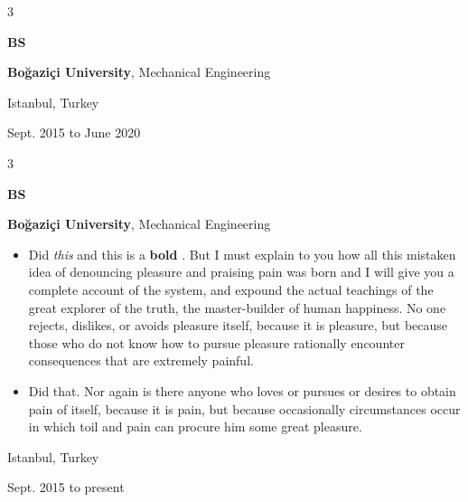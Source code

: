 \documentclass[10pt, letterpaper]{article}
\newenvironment{highlights}{
    \begin{itemize}[
        topsep=0.10 cm,
        parsep=0.10 cm,
        partopsep=0pt,
        itemsep=0pt,
        leftmargin=0.4 cm + 10pt
    ]
}{
    \end{itemize}
} %
\newenvironment{threecolentry}[3][]{
    \onecolentry
    \def\thirdColumn{#3}
    \setcolumnwidth{1 cm, \fill, 4.5 cm}
    \begin{paracol}{3}
    {\raggedright #2} \switchcolumn
}{
    \switchcolumn \raggedleft \thirdColumn
    \end{paracol}
    \endonecolentry
} %
\let\hrefWithoutArrow\href
\renewcommand{\href}[2]{\hrefWithoutArrow{#1}{\mbox{\ifthenelse{\equal{#2}{}}{ }{#2 }\raisebox{.15ex}{\footnotesize \faExternalLink*}}}}
\begin{document}
        \vspace{0.2 cm}

        \begin{threecolentry}{\textbf{BS}}{
            Istanbul, Turkey

        Sept. 2015 to June 2020
        }
            \textbf{Boğaziçi University}, Mechanical Engineering
        \end{threecolentry}

        \vspace{0.2 cm}

        \begin{threecolentry}{\textbf{BS}}{
            Istanbul, Turkey

        Sept. 2015 to present
        }
            \textbf{Boğaziçi University}, Mechanical Engineering
            \begin{highlights}
                \item Did \textit{this} and this is a \textbf{bold} \href{https://example.com}{link}. But I must explain to you how all this mistaken idea of denouncing pleasure and praising pain was born and I will give you a complete account of the system, and expound the actual teachings of the great explorer of the truth, the master-builder of human happiness. No one rejects, dislikes, or avoids pleasure itself, because it is pleasure, but because those who do not know how to pursue pleasure rationally encounter consequences that are extremely painful.
                \item Did that. Nor again is there anyone who loves or pursues or desires to obtain pain of itself, because it is pain, but because occasionally circumstances occur in which toil and pain can procure him some great pleasure.
            \end{highlights}
        \end{threecolentry}

        \vspace{0.2 cm}
\end{document}
